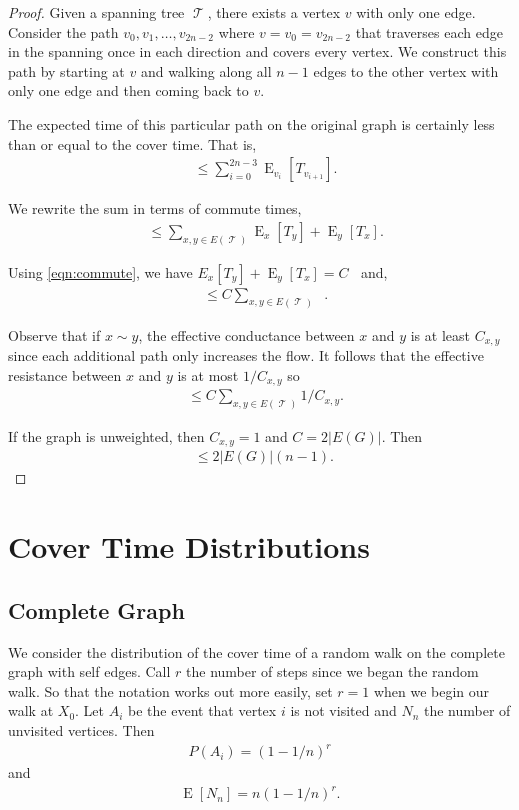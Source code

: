 \documentclass[12pt]{article}
\theoremstyle{definition}
\DeclareMathOperator{\E}{\mathrm{E}}		     %
\DeclareMathOperator{\tcov}{t_\textrm{cov}}      %
\DeclareMathOperator{\Rxy}{R_{\textrm{x,y}}}     %
\DeclareMathOperator{\T}{\mathcal{T}}            %
\begin{document}
\begin{proof}
Given a spanning tree $\T$, there exists a vertex $v$ with only one edge.
Consider the path $v_0, v_1, \ldots, v_{2n-2}$ where $v=v_0=v_{2n-2}$
that traverses each edge in the spanning once in each direction
and covers every vertex.
We construct this path by starting at $v$ and walking along all $n-1$ edges to the
other vertex with only one edge and then coming back to $v$.

The expected time of this particular path on the original graph is certainly less than
or equal to the cover time. That is,
\begin{align}
\tcov &\leq \sum_{i=0}^{2n-3} \E_{v_i}[T_{v_{i+1}}]. \nonumber
\end{align}

We rewrite the sum in terms of commute times,
\begin{align}
\tcov &\leq \sum_{x,y \in E(\T)} \E_x[T_y] + \E_y[T_x]. \nonumber
\end{align}

Using \cref{eqn:commute}, we have $E_x[T_y] + \E_y[T_x] = C \Rxy$ and,
\begin{align}
\tcov &\leq C \sum_{x,y \in E(\T)} \Rxy. \nonumber
\end{align}

Observe that if $x \sim y$,
the effective conductance between $x$ and $y$ is at least $C_{x,y}$
since each additional path only increases the flow.
It follows that the effective resistance between $x$ and $y$ is at most $1 / C_{x,y}$ so
\begin{align}
\tcov &\leq C \sum_{x,y \in E(\T)} 1 / C_{x,y}. \nonumber
\end{align}

If the graph is unweighted, then $C_{x,y} = 1$ and $C = 2 |E(G)|$.
Then
\begin{align}
\tcov \leq 2 |E(G)| (n-1). \nonumber
\end{align}

\end{proof}


\section{Cover Time Distributions}\label{sec:dist}
\subsection{Complete Graph}\label{sec:complete_dist}
\cite{Du11}
We consider the distribution of the cover time of a random walk
on the complete graph with self edges.
Call $r$ the number of steps since we began the random walk.
So that the notation works out more easily,
set $r=1$ when we begin our walk at $X_0$.
Let $A_i$ be the event that vertex $i$ is not visited and
$N_n$ the number of unvisited vertices.
Then
\begin{align}
P(A_i) = (1-1/n)^r \nonumber
\end{align}
and
\begin{align}
\E[N_n] = n(1-1/n)^r. \nonumber
\end{align}
\end{document}
